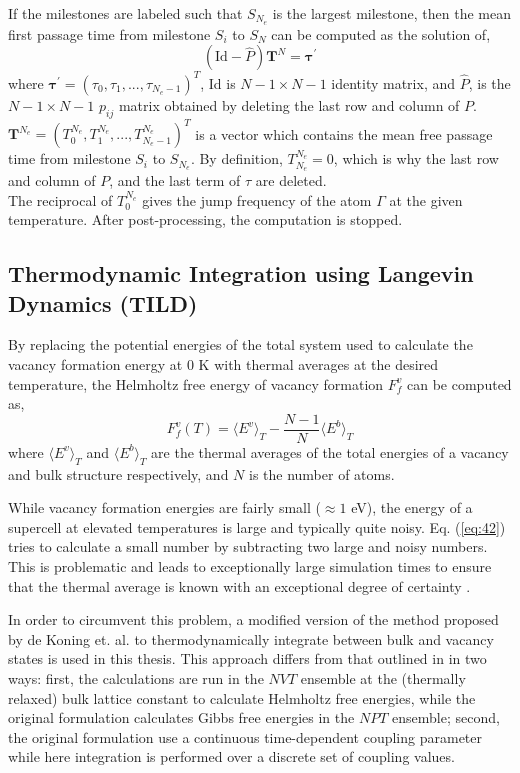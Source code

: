 \documentclass{article}
\begin{document}
If the milestones are labeled such that $S_{N_e}$ is the largest milestone, then the mean first passage time from milestone $S_i$ to $S_N$ can be computed as the solution of,
%
\begin{equation} \label{eq:41}
(\text{Id} - \hat{P})\bm{T}^N = \bm{\tau}^{\prime}
\end{equation}
%
where $\bm{\tau}^{\prime} = (\tau_0, \tau_1,...,\tau_{N_e - 1})^T$, Id is $N-1 \times N-1$ identity matrix, and $\hat{P}$, is the $N-1 \times N-1$ $p_{ij}$ matrix obtained by deleting the last row and column of $P$. $\bm{T}^{N_e} = (T_0^{N_e}, T_1^{N_e},...,T_{N_e-1}^{N_e})^T$ is a vector which contains the mean free passage time from milestone $S_i$ to $S_{N_e}$. By definition, $T_{N_e}^{N_e} = 0$, which is why the last row and column of $P$, and the last term of $\tau$ are deleted. \\

The reciprocal of $T_0^{N_e}$ gives the jump frequency of the atom $\Gamma$ at the given temperature. After post-processing, the computation is stopped.

\subsection{Thermodynamic Integration using Langevin Dynamics (TILD)} \label{TILD}

By replacing the potential energies of the total system used to calculate the vacancy formation energy at 0 K with thermal averages at the desired temperature, the Helmholtz free energy of vacancy formation $F_f^v$ can be computed as,
%
\begin{equation} \label{eq:42}
F_f^v(T) = \langle E^v \rangle_T - \frac{N-1}{N} \langle E^b \rangle_T
\end{equation}
%
where $\langle E^v \rangle_T$ and $\langle E^b \rangle_T$ are the thermal averages of the total energies of a vacancy and bulk structure respectively, and $N$ is the number of atoms.

While vacancy formation energies are fairly small ($\approx 1$ eV), the energy of a supercell at elevated temperatures is large and typically quite noisy. Eq. (\ref{eq:42}) tries to calculate a small number by subtracting two large and noisy numbers. This is problematic and leads to exceptionally large simulation times to ensure that the thermal average is known with an exceptional degree of certainty \cite{Glensk2013}.

In order to circumvent this problem, a modified version \cite{Wen2012} of the method proposed by de Koning et. al. \cite{deKoning} to thermodynamically integrate between bulk and vacancy states is used in this thesis. This approach differs from that outlined in \cite{deKoning} in two ways: first, the calculations are run in the $NVT$ ensemble at the (thermally relaxed) bulk lattice constant to calculate Helmholtz free energies, while the original formulation calculates Gibbs free energies in the $NPT$ ensemble; second, the original formulation use a continuous time-dependent coupling parameter while here integration is performed over a discrete set of coupling values.
\end{document}
